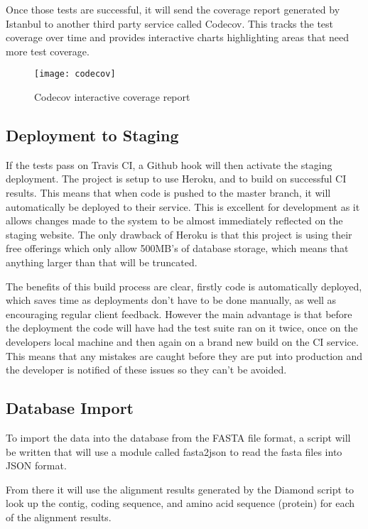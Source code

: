    Once those tests are successful, it will send the coverage report generated by Istanbul to another third party service called Codecov\cite{codecov}. This tracks the test coverage over time and provides interactive charts highlighting areas that need more test coverage. 

\begin{figure}[H]
\begin{center}
\texttt{[image: codecov]}
\caption{Codecov interactive coverage report}
\end{center}
\end{figure}


  \subsection{Deployment to Staging}
  If the tests pass on Travis CI, a Github hook will then activate the staging deployment. The project is setup to use Heroku\cite{heroku}, and to build on successful CI results. This means that when code is pushed to the master branch, it will automatically be deployed to their service. This is excellent for development as it allows changes made to the system to be almost immediately reflected on the staging website. The only drawback of Heroku is that this project is using their free offerings which only allow 500MB's of database storage, which means that anything larger than that will be truncated. 

  The benefits of this build process are clear, firstly code is automatically deployed, which saves time as deployments don't have to be done manually, as well as encouraging regular client feedback. However the main advantage is that before the deployment the code will have had the test suite ran on it twice, once on the developers local machine and then again on a brand new build on the CI service. This means that any mistakes are caught before they are put into production and the developer is notified of these issues so they can't be avoided. 



\subsection{Database Import}
To import the data into the database from the FASTA file format, a script will be written that will use a module called fasta2json\cite{fasta2json} to read the fasta files into JSON format. 

From there it will use the alignment results generated by the Diamond script to look up the contig, coding sequence, and amino acid sequence (protein) for each of the alignment results. 

